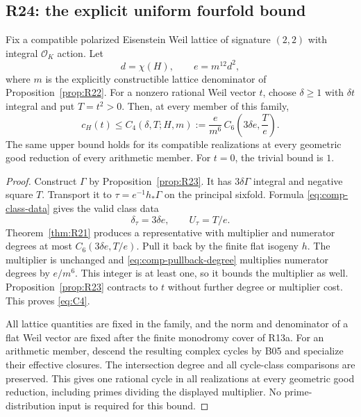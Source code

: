 \subsection{R24: the explicit uniform fourfold bound}

\begin{theorem}[R24]
\label{thm:R24}
Fix a compatible polarized Eisenstein Weil lattice of signature $(2,2)$ with integral $\mathcal O_K$ action. Let
\[
d=\chi(H),\qquad e=m^{12}d^2,
\]
where $m$ is the explicitly constructible lattice denominator of Proposition~\ref{prop:R22}. For a nonzero rational Weil vector $t$, choose $\delta\geq1$ with $\delta t$ integral and put $T=t^2>0$. Then, at every member of this family,
\begin{equation}
c_H(t)\leq C_4(\delta,T;H,m)
:=\frac{e}{m^6}\,
C_6\left(3\delta e,\frac{T}{e}\right).
\label{eq:C4}
\end{equation}
The same upper bound holds for its compatible realizations at every geometric good reduction of every arithmetic member. For $t=0$, the trivial bound is $1$.
\end{theorem}

\begin{proof}
Construct $\Gamma$ by Proposition~\ref{prop:R23}. It has $3\delta\Gamma$ integral and negative square $T$. Transport it to $\tau=e^{-1}h_*\Gamma$ on the principal sixfold. Formula \eqref{eq:comp-class-data} gives the valid class data
\[
\delta_\tau=3\delta e,\qquad U_\tau=T/e.
\]
Theorem~\ref{thm:R21} produces a representative with multiplier and numerator degrees at most $C_6(3\delta e,T/e)$. Pull it back by the finite flat isogeny $h$. The multiplier is unchanged and \eqref{eq:comp-pullback-degree} multiplies numerator degrees by $e/m^6$. This integer is at least one, so it bounds the multiplier as well. Proposition~\ref{prop:R23} contracts to $t$ without further degree or multiplier cost. This proves \eqref{eq:C4}.

All lattice quantities are fixed in the family, and the norm and denominator of a flat Weil vector are fixed after the finite monodromy cover of R13a. For an arithmetic member, descend the resulting complex cycles by B05 and specialize their effective closures. The intersection degree and all cycle-class comparisons are preserved. This gives one rational cycle in all realizations at every geometric good reduction, including primes dividing the displayed multiplier. No prime-distribution input is required for this bound.
\end{proof}

